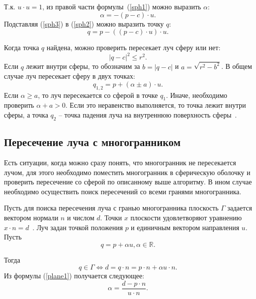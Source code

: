 Т.к. $u \cdot u = 1$, из правой части формулы~(\ref{sph1}) можно выразить $\alpha$:
\begin{equation}
	\label{sph3}
	\alpha = -(p - c) \cdot u.
\end{equation}
Подставляя (\ref{sph3}) в (\ref{sph2}) можно выразить точку $q$:
\begin{equation}
	q = p - ((p - c)\cdot u ) \cdot u.
\end{equation}

Когда точка $q$ найдена, можно проверить пересекает луч сферу или нет:
\begin{equation}
	|q-c|^2\leq r^2.
\end{equation}
Если $q$ лежит внутри сферы, то обозначим за $b = |q - c|$ и $a = \sqrt{r^2 - b^2}$. В общем случае луч пересекает сферу в двух точках:
\begin{equation}
	q_{1,2} = p + (\alpha \pm a)\cdot u.
\end{equation}
Если $\alpha \geq a$, то луч пересекается со сферой в точке $q_1$. Иначе, необходимо проверить $\alpha + a > 0$. Если это неравенство выполняется, то точка лежит внутри сферы, а точка $q_2$ -- точка падения луча на внутреннюю поверхность сферы~\cite{ray_sphere}.


\subsection{Пересечение луча с многогранником}
Есть ситуации, когда можно сразу понять, что многогранник не пересекается лучом, для этого необходимо поместить многогранник в сферическую оболочку и проверить пересечение со сферой по описанному выше алгоритму. В ином случае необходимо осуществить поиск пересечений со всеми гранями многогранника.

Пусть для поиска пересечения луча с гранью многогранника плоскость $\Gamma$ задается вектором нормали $n$ и числом $d$. Точки $x$ плоскости удовлетворяют уравнению $x \cdot n = d$~\cite{ray_sphere}.
Луч задан точкой положения $p$ и единичным вектором направления $u$. Пусть 
\begin{equation}
	q = p + \alpha u, \alpha \in \mathbb{R}.
\end{equation}

Тогда
\begin{equation}
	\label{plane1}
	q \in \Gamma \Leftrightarrow d = q \cdot n = p\cdot n + \alpha u\cdot n. 
\end{equation}
Из формулы (\ref{plane1}) получается следующее:
\begin{equation}
	\alpha = \frac{d - p \cdot n}{u \cdot n}.
\end{equation}

